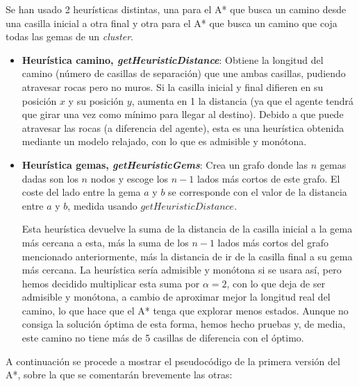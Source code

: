 \documentclass[11pt,a4paper]{article}
\begin{document}
Se han usado 2 heurísticas distintas, una para el A* que busca un camino desde una casilla inicial a
otra final y otra para el A* que busca un camino que coja todas las gemas de un \textit{cluster}.

\begin{itemize}[label=\textbullet]
	\item \textbf{Heurística camino, \textit{getHeuristicDistance}}:
	Obtiene la longitud del camino (número de
	casillas de separación) que une ambas casillas, pudiendo atravesar rocas pero no muros. Si la
	casilla inicial y final difieren en su posición $x$ y su posición $y$, aumenta en 1 la distancia
	(ya que el agente tendrá que girar una vez como mínimo para llegar al destino). Debido a que
	puede atravesar las rocas (a diferencia del agente), esta es una heurística obtenida mediante un
	modelo relajado, con lo que es admisible y monótona.
	\item \textbf{Heurística gemas, \textit{getHeuristicGems}}:
	Crea un grafo donde las $n$ gemas dadas son 
	los $n$ nodos y escoge los $n-1$ lados más cortos de este grafo. El coste del lado entre la gema
	$a$ y $b$ se corresponde con el valor de la distancia entre $a$ y $b$, medida usando
	$getHeuristicDistance$.
	
	Esta heurística devuelve la suma de la distancia de la casilla inicial a la gema más cercana a
	esta, más la suma de los $n-1$ lados más cortos del grafo mencionado anteriormente, más la
	distancia de ir de la casilla final a su gema más cercana. La heurística sería admisible y
	monótona si se usara así, pero hemos decidido multiplicar esta suma por $\alpha = 2$, con lo que
	deja de ser admisible y monótona, a cambio de aproximar mejor la longitud real del camino, lo que
	hace que el A* tenga que explorar menos estados. Aunque no consiga la solución óptima de esta
	forma, hemos hecho pruebas y, de media, este camino no tiene más de 5 casillas de diferencia con
	el óptimo.
\end{itemize}

A continuación se procede a mostrar el pseudocódigo de la primera versión del A*, sobre la que se
comentarán brevemente las otras:
\end{document}

